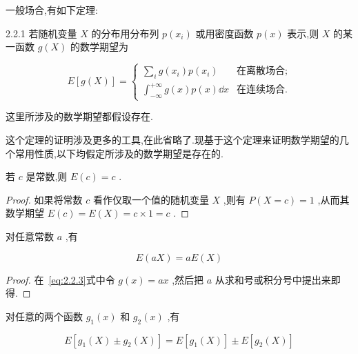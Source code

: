 一般场合,有如下定理:
\begin{theorem}{}{2.2.1}
	若随机变量 $ X $ 的分布用分布列 $ p(x_i) $ 或用密度函数 $ p(x) $ 表示,则 $ X $ 的某一函数 $ g(X) $ 的数学期望为
	
	\begin{equation}
	E[g(X)]=\left\{\begin{array}{ll}
	{\sum_{i} g\left(x_{i}\right) p\left(x_{i}\right)}&{\text{在离散场合;}} \\ {\int_{-\infty}^{+\infty} g(x) p(x) \dd x} &{\text{在连续场合.}} 
	\end{array}\right. \label{eq:2.2.3}
	\end{equation}
	
	这里所涉及的数学期望都假设存在.
	
\end{theorem}

这个定理的证明涉及更多的工具,在此省略了.现基于这个定理来证明数学期望的几个常用性质,以下均假定所涉及的数学期望是存在的.

\begin{property}
	
	若 $ c $ 是常数,则 $ E(c)=c $ .
	
\end{property}

\begin{proof}
	如果将常数 $ c $ 看作仅取一个值的随机变量 $ X $ ,则有 $ P(X=c)=1 $ ,从而其数学期望 $ E(c)=E(X)=c \times 1=c $ .
\end{proof}

\begin{property}
	对任意常数 $ a $ ,有
	
	\begin{equation}
	E ( a X ) = a E ( X ) \label{eq:2.2.4}
	\end{equation}
	
\end{property}

\begin{proof}
	在~\ref{eq:2.2.3}式中令 $ g(x)=ax $ ,然后把 $ a $ 从求和号或积分号中提出来即得.
\end{proof}

\begin{property}
	对任意的两个函数 $ g_1(x) $ 和 $ g_2(x) $ ,有
	
	\begin{equation}
	E \left[ g _ { 1 } ( X ) \pm g _ { 2 } ( X ) \right] = E \left[ g _ { 1 } ( X ) \right] \pm E \left[ g _ { 2 } ( X ) \right] \label{eq:2.2.5}
	\end{equation}
	
\end{property}

